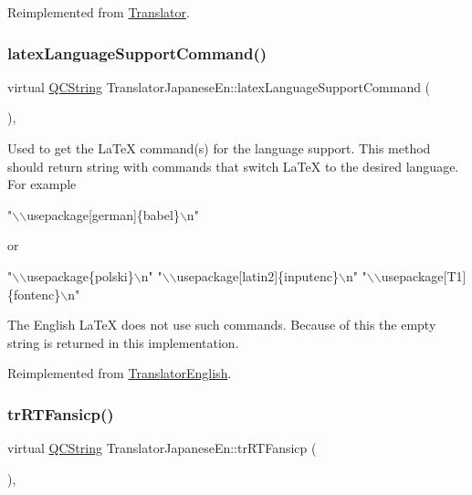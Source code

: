Reimplemented from \mbox{\hyperlink{class_translator_a573b483369d8d7cf7d85831a9da356be}{Translator}}.

\mbox{\label{class_translator_japanese_en_a82a0008e9f9183374a7581124053ca4f}} 
\subsubsection{\texorpdfstring{latexLanguageSupportCommand()}{latexLanguageSupportCommand()}}
{\footnotesize\ttfamily virtual \mbox{\hyperlink{class_q_c_string}{Q\+C\+String}} Translator\+Japanese\+En\+::latex\+Language\+Support\+Command (\begin{DoxyParamCaption}{ }\end{DoxyParamCaption})\hspace{0.3cm}{\ttfamily [inline]}, {\ttfamily [virtual]}}

Used to get the La\+TeX command(s) for the language support. This method should return string with commands that switch La\+TeX to the desired language. For example 
\begin{DoxyPre}"\(\backslash\)\(\backslash\)usepackage[german]\{babel\}\(\backslash\)n"
 \end{DoxyPre}
 or 
\begin{DoxyPre}"\(\backslash\)\(\backslash\)usepackage\{polski\}\(\backslash\)n"
 "\(\backslash\)\(\backslash\)usepackage[latin2]\{inputenc\}\(\backslash\)n"
 "\(\backslash\)\(\backslash\)usepackage[T1]\{fontenc\}\(\backslash\)n"
 \end{DoxyPre}


The English La\+TeX does not use such commands. Because of this the empty string is returned in this implementation. 

Reimplemented from \mbox{\hyperlink{class_translator_english_a48ecd4aaa9aa68947257ff29016a808a}{Translator\+English}}.

\mbox{\label{class_translator_japanese_en_a4da6df8b58582eb97ffef9f75e070c0f}} 
\subsubsection{\texorpdfstring{trRTFansicp()}{trRTFansicp()}}
{\footnotesize\ttfamily virtual \mbox{\hyperlink{class_q_c_string}{Q\+C\+String}} Translator\+Japanese\+En\+::tr\+R\+T\+Fansicp (\begin{DoxyParamCaption}{ }\end{DoxyParamCaption})\hspace{0.3cm}{\ttfamily [inline]}, {\ttfamily [virtual]}}

